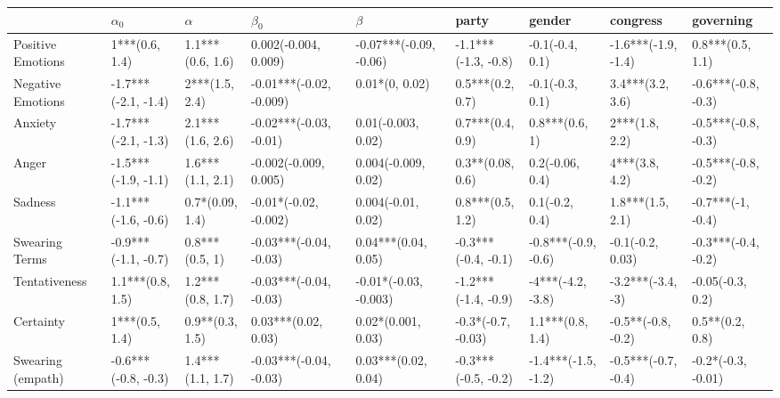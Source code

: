 \begin{tabular}{lllllllll}
\toprule
{} &           $\alpha_0$ &             $\alpha$ &                $\beta_0$ &                 $\beta$ &                party &               gender &             congress &            governing \\
\midrule
Positive Emotions     &       1***(0.6, 1.4) &     1.1***(0.6, 1.6) &     0.002(-0.004, 0.009) &  -0.07***(-0.09, -0.06) &  -1.1***(-1.3, -0.8) &      -0.1(-0.4, 0.1) &  -1.6***(-1.9, -1.4) &     0.8***(0.5, 1.1) \\
Negative Emotions     &  -1.7***(-2.1, -1.4) &       2***(1.5, 2.4) &  -0.01***(-0.02, -0.009) &          0.01*(0, 0.02) &     0.5***(0.2, 0.7) &      -0.1(-0.3, 0.1) &     3.4***(3.2, 3.6) &  -0.6***(-0.8, -0.3) \\
Anxiety               &  -1.7***(-2.1, -1.3) &     2.1***(1.6, 2.6) &   -0.02***(-0.03, -0.01) &      0.01(-0.003, 0.02) &     0.7***(0.4, 0.9) &       0.8***(0.6, 1) &       2***(1.8, 2.2) &  -0.5***(-0.8, -0.3) \\
Anger                 &  -1.5***(-1.9, -1.1) &     1.6***(1.1, 2.1) &    -0.002(-0.009, 0.005) &     0.004(-0.009, 0.02) &     0.3**(0.08, 0.6) &      0.2(-0.06, 0.4) &       4***(3.8, 4.2) &  -0.5***(-0.8, -0.2) \\
Sadness               &  -1.1***(-1.6, -0.6) &      0.7*(0.09, 1.4) &    -0.01*(-0.02, -0.002) &      0.004(-0.01, 0.02) &     0.8***(0.5, 1.2) &       0.1(-0.2, 0.4) &     1.8***(1.5, 2.1) &    -0.7***(-1, -0.4) \\
Swearing Terms        &  -0.9***(-1.1, -0.7) &       0.8***(0.5, 1) &   -0.03***(-0.04, -0.03) &     0.04***(0.04, 0.05) &  -0.3***(-0.4, -0.1) &  -0.8***(-0.9, -0.6) &     -0.1(-0.2, 0.03) &  -0.3***(-0.4, -0.2) \\
Tentativeness         &     1.1***(0.8, 1.5) &     1.2***(0.8, 1.7) &   -0.03***(-0.04, -0.03) &   -0.01*(-0.03, -0.003) &  -1.2***(-1.4, -0.9) &    -4***(-4.2, -3.8) &    -3.2***(-3.4, -3) &     -0.05(-0.3, 0.2) \\
Certainty             &       1***(0.5, 1.4) &      0.9**(0.3, 1.5) &      0.03***(0.02, 0.03) &      0.02*(0.001, 0.03) &   -0.3*(-0.7, -0.03) &     1.1***(0.8, 1.4) &   -0.5**(-0.8, -0.2) &      0.5**(0.2, 0.8) \\
Swearing (empath)     &  -0.6***(-0.8, -0.3) &     1.4***(1.1, 1.7) &   -0.03***(-0.04, -0.03) &     0.03***(0.02, 0.04) &  -0.3***(-0.5, -0.2) &  -1.4***(-1.5, -1.2) &  -0.5***(-0.7, -0.4) &   -0.2*(-0.3, -0.01) \\

\end{tabular}
